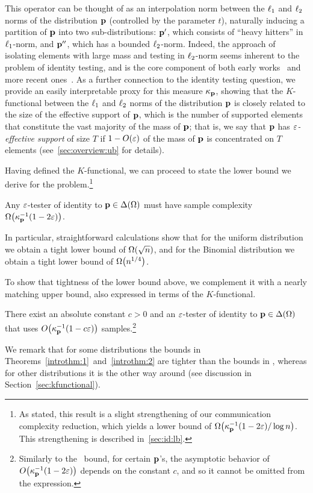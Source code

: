 This operator can be thought of as an interpolation norm between the $\lp[1]$ and $\lp[2]$ norms of the distribution $\p$ (controlled by the parameter $t$), naturally inducing a partition of $\p$ into two sub-distributions: $\p'$, which consists of ``heavy hitters'' in $\lp[1]$-norm, and $\p''$, which has a bounded $\lp[2]$-norm. Indeed, the approach of isolating elements with large mass and testing in $\lp[2]$-norm seems inherent to the problem of identity testing, and is the core component of both early works~\cite{GRexp:00,BFFKRW:01} and more recent ones~\cite{DKN:15,DK:16,Gol:16}. As a further connection to the identity testing question, we provide an easily interpretable proxy for this measure $\kf{\p}$, showing that the $K$-functional between the $\lp[1]$ and $\lp[2]$ norms of the distribution $\p$ is closely related to the size of the effective support of $\p$, which is the number of supported elements that constitute the vast majority of the mass of $\p$; that is, we say that $\p$ has \emph{$\eps$-effective support} of size $T$ if $1- O(\eps)$ of the mass of $\p$ is concentrated on $T$ elements (see~\cref{sec:overview:ub} for details).

Having defined the $K$-functional, we can proceed to state the lower bound we derive for the problem.\footnote{As stated, this result is a slight strengthening of our communication complexity reduction, which yields a lower bound of $\bigOmega{\kf{\p}^{-1}(1-2\eps)/\log n}$. This strengthening is described in~\cref{sec:id:lb}.}
\begin{theorem}
\label{introthm:1}
Any $\eps$-tester of identity to $\p\in\distribs{\Omega}$ must have sample complexity $\bigOmega{\kf{\p}^{-1}(1-2\eps)}$.
\end{theorem}
\noindent 
In particular, straightforward calculations show that for the uniform distribution we obtain a tight lower bound of $\bigOmega{\sqrt{n}}$, and for the Binomial distribution we obtain a tight lower bound of $\bigOmega{n^{1/4}}$.

To show that tightness of the lower bound above, we complement it with a nearly matching upper bound, also expressed in terms of the $K$-functional.
\begin{theorem}
\label{introthm:2}
There exist an absolute constant $c>0$ and an $\eps$-tester of identity to $\p\in\distribs{\Omega}$ that uses $\bigO{\kf{\p}^{-1}(1-c\eps)}$ samples.\footnote{Similarly to the~\cite{VV:14} bound, for certain $\p$'s, the asymptotic behavior of $\bigO{\kf{\p}^{-1}(1-2\eps)}$ depends on the constant $c$, and so it cannot be omitted from the expression.}
\end{theorem}
\noindent We remark that for some distributions the bounds in Theorems~\ref{introthm:1}~and~\ref{introthm:2} are tighter than the bounds in \cite{VV:14}, whereas for other distributions it is the other way around (see discussion in Section~\ref{sec:kfunctional}).

